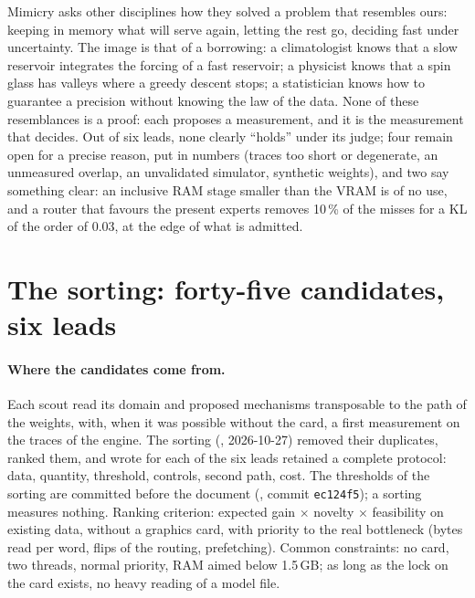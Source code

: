 \begin{enbref}
Mimicry asks other disciplines how they solved a problem that resembles ours: keeping in memory what will serve again, letting the rest go, deciding fast under uncertainty. The image is that of a borrowing: a climatologist knows that a slow reservoir integrates the forcing of a fast reservoir; a physicist knows that a spin glass has valleys where a greedy descent stops; a statistician knows how to guarantee a precision without knowing the law of the data. None of these resemblances is a proof: each proposes a measurement, and it is the measurement that decides. Out of six leads, none clearly ``holds'' under its judge; four remain open for a precise reason, put in numbers (traces too short or degenerate, an unmeasured overlap, an unvalidated simulator, synthetic weights), and two say something clear: an inclusive RAM stage smaller than the VRAM is of no use, and a router that favours the present experts removes 10\,\% of the misses for a KL of the order of 0.03, at the edge of what is admitted.
\end{enbref}

\section{The sorting: forty-five candidates, six leads}\label{t3mim:sec:tri}

\paragraph{Where the candidates come from.} Each scout read its domain and proposed mechanisms transposable to the path of the weights, with, when it was possible without the card, a first measurement on the traces of the engine. The sorting (, 2026-10-27) removed their duplicates, ranked them, and wrote for each of the six leads retained a complete protocol: data, quantity, threshold, controls, second path, cost. The thresholds of the sorting are committed before the document (, commit \texttt{ec124f5}); a sorting measures nothing. Ranking criterion: expected gain $\times$ novelty $\times$ feasibility on existing data, without a graphics card, with priority to the real bottleneck (bytes read per word, flips of the routing, prefetching). Common constraints: no card, two threads, normal priority, RAM aimed below 1.5\,GB; as long as the lock on the card exists, no heavy reading of a model file.

